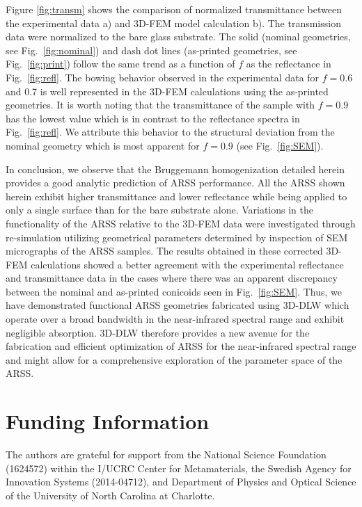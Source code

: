 \documentclass[9pt,twocolumn,twoside]{osajnl}
\begin{document}
Figure \ref{fig:transm} shows the comparison of normalized transmittance between the experimental data a) and 3D-FEM model calculation b). The transmission data were normalized to the bare glass substrate. The solid (nominal geometries, see Fig.~\ref{fig:nominal}) and dash dot lines (as-printed geometries, see Fig.~\ref{fig:print}) follow the same trend as a function of $f$ as the reflectance in Fig.~\ref{fig:refl}. The bowing behavior observed in the experimental data for $f=0.6$ and 0.7 is well represented in the 3D-FEM calculations using the as-printed geometries. It is worth noting that the transmittance of the sample with $f=0.9$ has the lowest value which is in contrast to the reflectance spectra in Fig.~\ref{fig:refl}. We attribute this behavior to the structural deviation from the nominal geometry which is most apparent for $f=0.9$ (see Fig.~\ref{fig:SEM}). 


In conclusion, we observe that the Bruggemann homogenization detailed herein provides a good analytic prediction of ARSS performance. All the ARSS shown herein exhibit higher transmittance and lower reflectance while being applied to only a single surface than for the bare substrate alone.  Variations in the functionality of the ARSS relative to the 3D-FEM data were investigated through re-simulation utilizing geometrical parameters determined by inspection of SEM micrographs of the ARSS samples. The results obtained in these corrected 3D-FEM calculations showed a better agreement with the experimental reflectance and transmittance data in the cases where there was an apparent discrepancy between the nominal and as-printed conicoids seen in Fig.~\ref{fig:SEM}. Thus, we have demonstrated functional ARSS geometries fabricated using 3D-DLW which operate over a broad bandwidth in the near-infrared spectral range and exhibit negligible absorption. 3D-DLW therefore provides a new avenue for the fabrication and efficient optimization of ARSS for the near-infrared spectral range and might allow for a comprehensive exploration of the parameter space of the ARSS.  


\section*{Funding Information}
The authors are grateful for support from the National Science Foundation (1624572) within the I/UCRC Center for Metamaterials, the Swedish Agency for Innovation Systems (2014-04712), and Department of Physics and Optical Science of the University of North Carolina at Charlotte.
\end{document}
